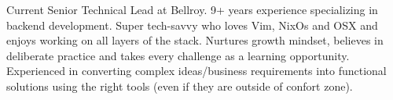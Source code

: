 

\begin{cvparagraph}

  Current Senior Technical Lead at Bellroy. 9+ years experience specializing in backend development. Super tech-savvy who loves Vim, NixOs and OSX and enjoys working on all layers of the stack. Nurtures growth mindset, believes in deliberate practice and takes every challenge as a learning opportunity. Experienced in converting complex ideas/business requirements into functional solutions using the right tools (even if they are outside of confort zone).
\end{cvparagraph}
